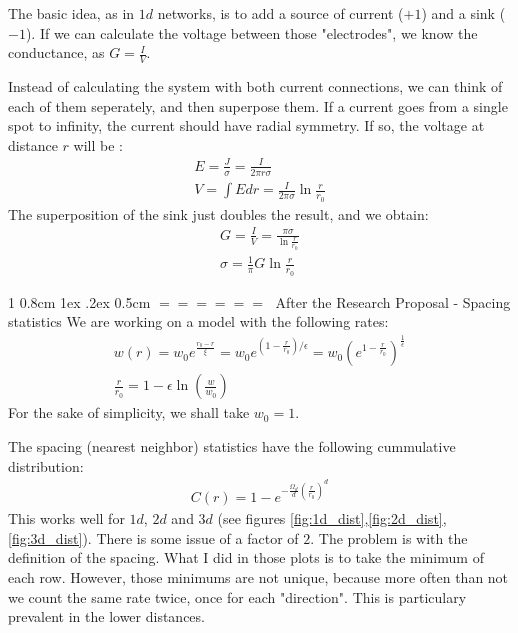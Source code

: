 \documentclass[onecolumn,fleqn,notitlepage,secnumarabic]{revtex4}
\makeatletter
\def\section{%
  \@startsection
    {section}%
    {1}%
    {\z@}%
    {0.8cm \@plus1ex \@minus .2ex}%
    {0.5cm}%
    {\Large\bf $=\!=\!=\!=\!=\!=\;$}%
}%
\makeatother
\begin{document}
The basic idea, as in $1d$ networks, is to add a source of current ($+1$) and a sink ($-1$). If we can calculate the voltage between those "electrodes", we know the conductance, as $G = \frac{I}{V}$. 

Instead of calculating the system with both current connections, we can think of each of them seperately, and then superpose them. If a current goes from a single spot to infinity, the current should have radial symmetry. If so, the voltage at distance $r$ will be :
\begin{align}
  E = \frac{J}{\sigma} = \frac{I}{2\pi r\sigma} \\
  V = \int E dr = \frac{I}{2\pi\sigma}\ln\frac{r}{r_0}
\end{align}
The superposition of the sink just doubles the result, and we obtain:
\begin{align}
    G = \frac{I}{V} = \frac{\pi\sigma }{\ln\frac{r}{r_0}}  \\
    \sigma = \frac{1}{\pi}G\ln\frac{r}{r_0}
\end{align}


\section{After the Research Proposal - Spacing statistics}
We are working on a model with the following rates:
\begin{align}
    w(r) = w_0 e^{\frac{r_0-r}{\xi}}=w_0e^{(1-\frac{r}{r_0})/\epsilon} = w_0 \left(e^{1-\frac{r}{r_0}}\right)^\frac{1}{\epsilon}\\
    \frac{r}{r_0} = 1 - \epsilon\ln \left(\frac{w}{w_0}\right)
\end{align}
For the sake of simplicity, we shall take $w_0=1$.

The spacing (nearest neighbor) statistics have the following cummulative distribution:
\begin{align}
    C(r) = 1-e^{-\frac{\Omega_d}{d}\left(\frac{r}{r_0}\right)^d}
\end{align}
This works well for $1d$, $2d$ and $3d$ (see figures \ref{fig:1d_dist},\ref{fig:2d_dist},\ref{fig:3d_dist}). There is some issue of a factor of $2$. The problem is with the definition of the spacing. What I did in those plots is to take the minimum of each row. However, those minimums are not unique, because more often than not we count the same rate twice, once for each "direction". This is particulary prevalent in the lower distances.
\end{document}
